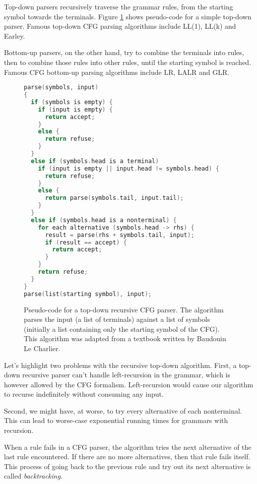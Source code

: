 Top-down parsers recursively traverse the grammar rules, from the starting
symbol towards the terminals. Figure \ref{cfg_parse_pseudo} shows pseudo-code
for a simple top-down parser. Famous top-down CFG parsing algorithms include
LL(1), LL(k) and Earley.

Bottom-up parsers, on the other hand, try to combine the terminals into rules,
then to combine those rules into other rules, until the starting symbol is
reached. Famous CFG bottom-up parsing algorithms include LR, LALR and GLR.

\begin{figure}[here]
\small
\begin{lstlisting}[language=C,frame=single]
parse(symbols, input)
{
  if (symbols is empty) {
    if (input is empty) {
      return accept;
    }
    else {
      return refuse;
    }
  }
  else if (symbols.head is a terminal)
    if (input is empty || input.head != symbols.head) {
      return refuse;
    }
    else {
      return parse(symbols.tail, input.tail);
    }
  }
  else if (symbols.head is a nonterminal) {
    for each alternative (symbols.head -> rhs) {
      result = parse(rhs + symbols.tail, input);
      if (result == accept) {
        return accept;
      }
    }
    return refuse;
  }
}
parse(list(starting symbol), input);
\end{lstlisting}
\caption{Pseudo-code for a top-down recursive CFG parser. The algorithm parses
  the input (a list of terminals) against a list of symbols (initially a list
  containing only the starting symbol of the CFG). This algorithm was adapted
  from a textbook written by Baudouin Le Charlier. \cite{lecharlier2012}}
\label{cfg_parse_pseudo}
\end{figure}

Let's highlight two problems with the recursive top-down algorithm. First, a
top-down recursive parser can't handle left-recursion in the grammar, which is
however allowed by the CFG formalism. Left-recursion would cause our algorithm
to recurse indefinitely without consuming any input.

Second, we might have, at worse, to try every alternative of each
nonterminal. This can lead to worse-case exponential running times for grammars
with recursion.

When a rule fails in a CFG parser, the algorithm tries the next alternative of
the last rule encountered. If there are no more alternatives, then that rule
fails itself. This process of going back to the previous rule and try out its
next alternative is called \emph{backtracking}.


